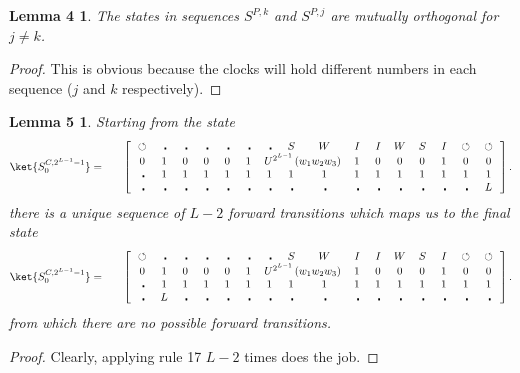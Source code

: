 \documentclass[11pt,letterpaper]{article}
\newtheorem*{lem4}{Lemma 4}
\newtheorem*{lem5}{Lemma 5}
\newcommand{\<}{\langle}
\renewcommand{\>}{\rangle}
\newcommand{\tur}{\,\circlearrowleft\,}   %
\newcommand{\bul}{\:\:\centerdot\:}       %
\newcommand{\iga}{\:I\,}                  %
\newcommand{\wga}{W}						%
\newcommand{\sga}{\:S\,}					%
\begin{document}
\begin{lem4}
The states in sequences $S^{P,k}$ and $S^{P,j}$ are mutually orthogonal for $j\neq k$.
\end{lem4}
\begin{proof}
This is obvious because the clocks will hold different numbers in each sequence ($j$ and $k$ respectively).
\end{proof}
\begin{lem5}
Starting from the state
		\begin{eqnarray}
			\ket{S^{C,2^{L-1}-1}_{0}} &=& \quad \left[ \begin{array}{cccccccccccccccc}
				\tur & \bul & 
				\bul & \bul & \bul & \bul & \bul & \sga & \wga & \iga & \iga & 
			\wga & \sga & \iga & \tur & \tur
				\\		
				0    & 1    & 0    & 0    & 0    & 1    & 
				\multicolumn{3}{c}{U^{2^{L-1}}\left(w_1w_2w_3\right)}  &
				1    & 0    & 0    & 0    & 1    & 0 & 0
				\\
				\bul & 1 & 1& 1& 1& 1& 1& 1& 1& 1& 1& 1& 1& 1& 1& 1
				\\
				\bul & \bul & \bul & \bul & \bul & \bul & \bul & \bul & \bul & \bul & \bul & \bul & \bul & \bul & \bul & L
		 	\end{array} \right]. \label{endstate}
		\end{eqnarray}
there is a unique sequence of $L-2$ forward transitions which maps us to the final state
	\begin{eqnarray}
		\ket{S^{C,2^{L-1}-1}_{0}} &=& \quad \left[ \begin{array}{cccccccccccccccc}
			\tur & \bul & 
			\bul & \bul & \bul & \bul & \bul & \sga & \wga & \iga & \iga & 
		\wga & \sga & \iga & \tur & \tur
			\\		
			0    & 1    & 0    & 0    & 0    & 1    & 
			\multicolumn{3}{c}{U^{2^{L-1}}\left(w_1w_2w_3\right)}  &
			1    & 0    & 0    & 0    & 1    & 0 & 0
			\\
			\bul & 1 & 1& 1& 1& 1& 1& 1& 1& 1& 1& 1& 1& 1& 1& 1
			\\
			\bul & L & \bul & \bul & \bul & \bul & \bul & \bul & \bul & \bul & \bul & \bul & \bul & \bul & \bul & \bul
	 	\end{array} \right]. \label{endstate}
	\end{eqnarray}
from which there are no possible forward transitions.
\end{lem5}
\begin{proof}
Clearly, applying rule 17 $L-2$ times does the job.
\end{proof}
\end{document}
